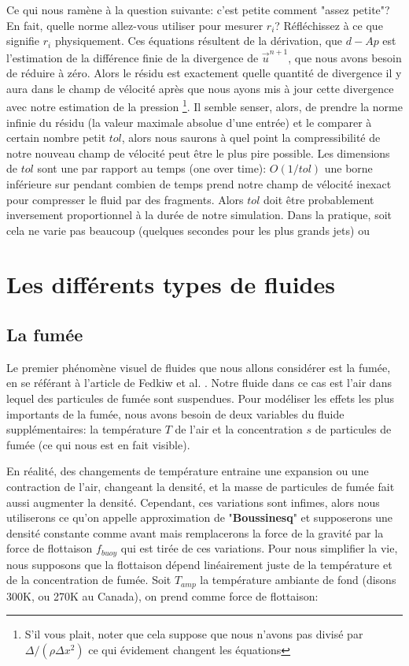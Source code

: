 \documentclass[11pt]{report}
\begin{document}
Ce qui nous ramène à la question suivante: c'est petite comment "assez petite"? En fait, quelle norme allez-vous utiliser pour mesurer $r_i$? Réfléchissez à ce que signifie $r_i$ physiquement. Ces équations résultent de la dérivation, que $d-Ap$ est l'estimation de la différence finie de la divergence de $\overrightarrow{u}^{n+1}$, que nous avons besoin de réduire à zéro. Alors le résidu est exactement quelle quantité de divergence il y aura dans le champ de vélocité après que nous ayons mis à jour cette divergence avec notre estimation de la pression \footnote{S'il vous plait, noter que cela suppose que nous n'avons pas divisé par $\Delta / (\rho \Delta x^2)$ ce qui évidement changent les équations}. Il semble   senser, alors, de prendre la norme infinie du résidu (la valeur maximale absolue d'une entrée) et le comparer à certain nombre petit $tol$, alors nous saurons à quel point la compressibilité de notre nouveau champ de vélocité peut être le plus pire possible. Les dimensions de $tol$ sont une par rapport au temps (one over time): $O(1/tol)$ une borne inférieure sur pendant combien de temps prend notre champ de vélocité inexact pour compresser le fluid par des fragments. Alors $tol$ doit être probablement inversement proportionnel à la durée de notre simulation. Dans la pratique, soit cela ne varie pas beaucoup (quelques secondes pour les plus grands jets) ou  


\part{Les différents types de fluides}

\chapter{La fumée}

Le premier phénomène visuel de fluides que nous allons considérer est la fumée, en se référant à l'article de Fedkiw et al. \cite{fedkiw-stam-jensen-01}. Notre fluide dans ce cas est l'air dans lequel des particules de fumée sont suspendues. Pour modéliser les effets les plus importants de la fumée, nous avons besoin de deux variables du fluide supplémentaires: la température $T$ de l'air et la concentration $s$ de particules de fumée (ce qui nous est en fait visible).\newline

En réalité, des changements de température entraine une expansion ou une contraction de l'air, changeant la densité, et la masse de particules de fumée fait aussi augmenter la densité. Cependant, ces variations sont infimes, alors nous utiliserons ce qu'on appelle approximation de "\textbf{Boussinesq}" et supposerons une densité constante comme avant mais remplacerons la force de la gravité par la force de flottaison \textit{$f_{buoy}$} qui est tirée de ces variations. Pour nous simplifier la vie, nous supposons que la flottaison dépend linéairement juste de la température et de la concentration de fumée. Soit $T_{amp}$ la température ambiante de fond (disons 300K, ou 270K au Canada), on prend comme force de flottaison:
\end{document}
